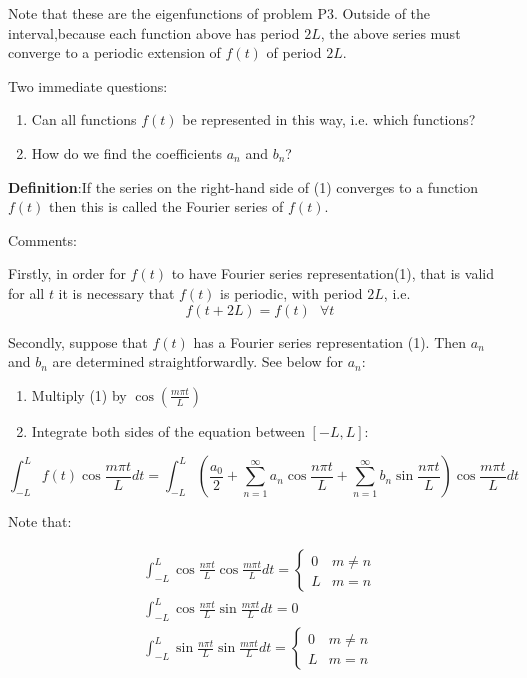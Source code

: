 \documentclass{article}
\begin{document}
Note that these are the eigenfunctions of problem P3. Outside of the interval,because each function above has period $2L$, the above series must converge to a periodic extension of $f(t)$ of period $2L$.

Two immediate questions:
\begin{enumerate}
    \item Can all functions $f(t)$ be represented in this way, i.e. which functions?
    \item How do we find the coefficients $a_n$ and $b_n$?
\end{enumerate}

\textbf{Definition}:If the series on the right-hand side of (1) converges to a function $f(t)$ then this is called the Fourier series of $f(t)$. 

\hfill

Comments:

Firstly, in order for $f(t)$ to have Fourier series representation(1), that is valid for all $t$ it is necessary that $f(t)$ is periodic, with period $2L$, i.e. $$f(t + 2L) = f(t) \text{     } \forall t$$

Secondly, suppose that $f(t)$ has a Fourier series representation (1). Then $a_n$ and $b_n$ are determined straightforwardly. See below for $a_n$:

\begin{enumerate}
    \item Multiply (1) by $\cos(\frac{m \pi t}{L})$
    \item Integrate both sides of the equation between $[-L, L]$:
\end{enumerate}

$$\int_{-L}^{L} f(t) \cos \frac{m \pi t}{L} d t=\int_{-L}^{L}\left(\frac{a_{0}}{2}+\sum_{n=1}^{\infty} a_{n} \cos \frac{n \pi t}{L}+\sum_{n=1}^{\infty} b_{n} \sin \frac{n \pi t}{L}\right) \cos \frac{m \pi t}{L} d t$$

Note that:

$$
\begin{array}{l}
\int_{-L}^{L} \cos \frac{n \pi t}{L} \cos \frac{m \pi t}{L} d t=\left\{\begin{array}{ll}
0 & m \neq n \\
L & m=n
\end{array}\right. \\
\int_{-L}^{L} \cos \frac{n \pi t}{L} \sin \frac{m \pi t}{L} d t=0 \\
\int_{-L}^{L} \sin \frac{n \pi t}{L} \sin \frac{m \pi t}{L} d t=\left\{\begin{array}{ll}
0 & m \neq n \\
L & m=n
\end{array}\right.
\end{array}
$$
\end{document}
